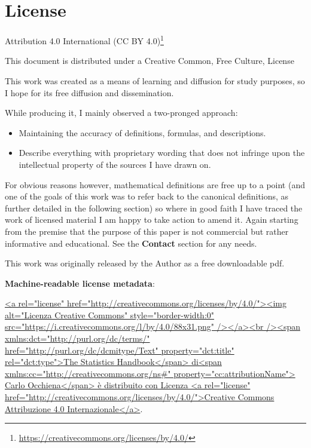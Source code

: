 \documentclass{article}
\begin{document}
\clearpage

\section{License}
Attribution 4.0 International (CC BY 4.0)\footnote{\url{https://creativecommons.org/licenses/by/4.0/}}

This document is distributed under a Creative Common, Free Culture, License

This work was created as a means of learning and diffusion for study purposes, so I hope for its free diffusion and dissemination.

While producing it, I mainly observed a two-pronged approach:
\begin{itemize}
    \item Maintaining the accuracy of definitions, formulas, and descriptions.
    \item Describe everything with proprietary wording that does not infringe upon the intellectual property of the sources I have drawn on.
\end{itemize}

For obvious reasons however, mathematical definitions are free up to a point (and one of the goals of this work was to refer back to the canonical definitions, as further detailed in the following section) so where in good faith I have traced the work of licensed material I am happy to take action to amend it. Again starting from the premise that the purpose of this paper is not commercial but rather informative and educational. See the \textbf{Contact} section for any needs.

This work was originally released by the Author as a free downloadable pdf. 

\textbf{Machine-readable license metadata}:\\
\begin{sloppypar}
\url{<a rel="license" href="http://creativecommons.org/licenses/by/4.0/"><img alt="Licenza Creative Commons" style="border-width:0" src="https://i.creativecommons.org/l/by/4.0/88x31.png" /></a><br /><span xmlns:dct="http://purl.org/dc/terms/" href="http://purl.org/dc/dcmitype/Text" property="dct:title" rel="dct:type">The Statistics Handbook</span> di<span xmlns:cc="http://creativecommons.org/ns#" property="cc:attributionName"> Carlo Occhiena</span> è distribuito con Licenza <a rel="license" href="http://creativecommons.org/licenses/by/4.0/">Creative Commons Attribuzione 4.0 Internazionale</a>}.
\end{sloppypar}
\end{document}

